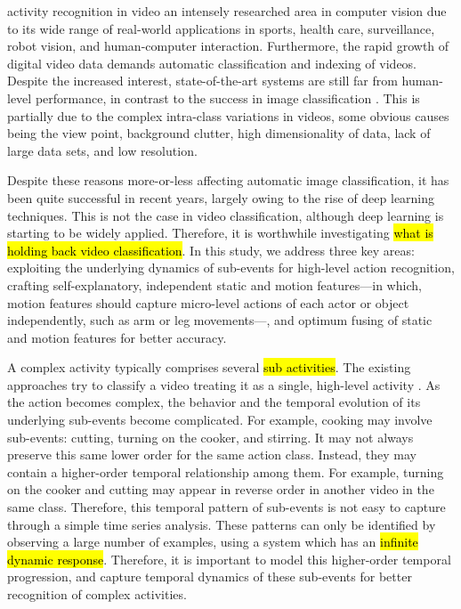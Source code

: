 
 activity recognition in video 
an intensely researched area in computer vision due to its wide range of real-world applications in
sports, health care, surveillance, robot vision, and human-computer interaction.
Furthermore, the rapid growth of digital video data demands automatic
classification and indexing of videos. Despite the increased interest, state-of-the-art
systems are still far from human-level performance, in contrast to the success in image classification \cite{girshick2014rich, krizhevsky2012imagenet}. This is partially due to the complex intra-class variations in videos, some obvious causes being the view point, background
clutter, high dimensionality of data, lack of large data sets, and low resolution.

Despite these reasons more-or-less affecting automatic image classification, it has been quite successful in recent years,
largely owing to the rise of deep learning techniques. This is not the case in video classification, although deep learning is
starting to be widely applied. Therefore, it is worthwhile investigating
\hl{what is holding back video classification}. In this study, we address three key
areas: exploiting the underlying dynamics of sub-events for high-level action recognition, crafting
self-explanatory, independent static and motion features---in which, motion features should capture micro-level actions
of each actor or object independently, such as arm or leg movements---, and optimum fusing of static and motion features for better accuracy.

A complex activity typically comprises several \hl{sub activities}.
The existing approaches try to classify a video treating it as a
single, high-level activity \cite{wang2011action, wang2013action, simonyan2014two, 7486474}.
As the action becomes complex, the behavior and the
temporal evolution of its underlying sub-events become complicated. For example,
cooking may involve sub-events: cutting, turning on the cooker, and stirring. It may not always preserve this
same lower order for the same action class. Instead, they may contain
a higher-order temporal relationship among them. For example, turning on the cooker and cutting
may appear in reverse order in another video in the same class.
Therefore, this temporal pattern of sub-events is not easy to capture through a simple
time series analysis. These patterns can only be identified by observing a large number
of examples, using a system which has an \hl{infinite dynamic response}. Therefore, it is important to
model this higher-order temporal
progression, and capture temporal dynamics of these sub-events for better recognition of
complex activities.

